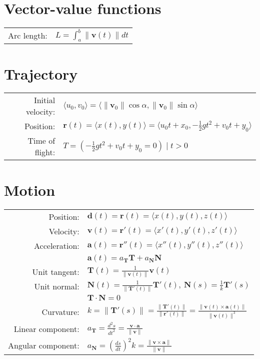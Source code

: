 \documentclass[fleqn]{article}
\renewcommand{\vec}[1]{\mathbf{#1}}
\begin{document}
\section*{Vector-value functions}
\begin{tabularx}{\linewidth}{r l}
  Arc length: & \( L=\int_a^b\|\vec v(t)\|dt \) \\
\end{tabularx}

\section*{Trajectory}
\begin{tabularx}{\linewidth}{r l}
  Initial velocity: & \( \langle u_0,v_0\rangle=\langle\|\vec v_0\|\cos\alpha,\|\vec v_0\|\sin\alpha\rangle \) \\
  Position: & \( \vec r(t)=\langle x(t),y(t)\rangle=\langle u_0t+x_0,-\tfrac{1}{2}gt^2+v_0t+y_0\rangle \) \\
  Time of flight: & \( T=(-\tfrac{1}{2}gt^2+v_0t+y_0=0)\mid t>0 \) \\
\end{tabularx}

\section*{Motion}
\begin{tabularx}{\linewidth}{r l}
  Position: & \( \vec d(t)=\vec r(t)=\langle x(t),y(t),z(t)\rangle \) \\
  Velocity: & \( \vec v(t)=\vec r'(t)=\langle x'(t),y'(t),z'(t)\rangle \) \\
  Acceleration: &
    \( \vec a(t)=\vec r''(t)=
      \langle x''(t),y''(t),z''(t)\rangle \) \\
  & \( \vec a(t)=a_{\vec T}\vec T+a_{\vec N}\vec N \) \\
  Unit tangent:      & \( \vec T(t)=\frac{1}{\|\vec v(t)\|}\vec v(t) \) \\
  Unit normal:       & \( \vec N(t)=\frac{1}{\|\vec T'(t)\|}\vec T'(t),\ \vec N(s)=\frac{1}{k}\vec T'(s) \) \\
  & \( \vec T\cdot\vec N=0 \) \\
  Curvature:         & \( k=\|\vec T'(s)\|=\frac{\|\vec T'(t)\|}{\|\vec r'(t)\|}=\frac{\|\vec v(t)\times\vec a(t)\|}{\|\vec v(t)\|^3} \) \\
  Linear component:  & \( a_{\vec T}=\frac{d^2s}{dt^2}=\frac{\vec v\cdot\vec a}{\|\vec v\|} \) \\
  Angular component: & \( a_{\vec N}={\left(\frac{ds}{dt}\right)}^2 k=\frac{\|\vec v\times\vec a\|}{\|\vec v\|} \) \\
\end{tabularx}
\end{document}

